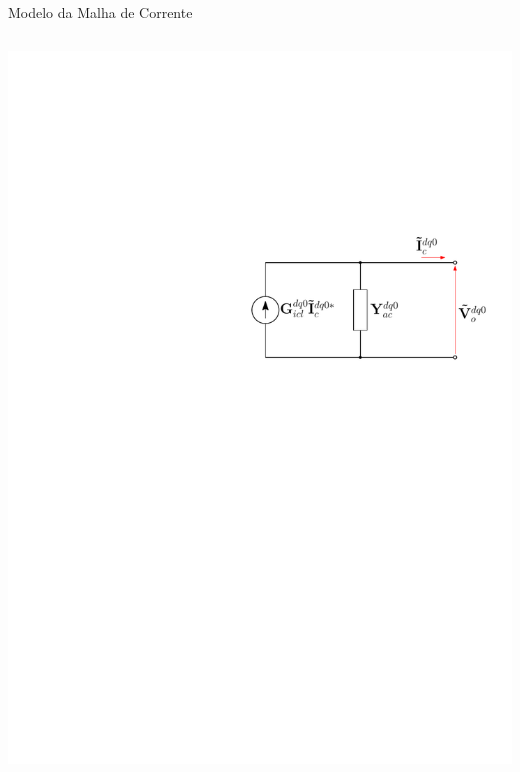 \begin{frame}{Modelo da Malha de Corrente}


%	
%	
%

\begin{columns}

\centering

\includegraphics[width=0.9\linewidth]{./figuras/figuras_srf/Northon_SRF_I}


\centering


\end{columns}
\end{frame}
